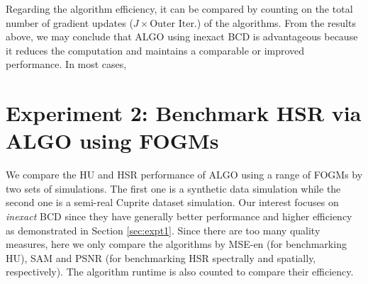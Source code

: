 Regarding the algorithm efficiency, it can be compared by counting on the 
total number of gradient updates ($J\times\text{Outer Iter.}$) of the
algorithms.
From the results above, we may conclude that ALGO using inexact BCD is
advantageous because it reduces the computation and maintains a comparable or
improved performance.
In most cases, 

\section{Experiment 2: Benchmark HSR via ALGO using FOGMs}
We compare the HU and HSR performance of ALGO using a range of FOGMs by two
sets of simulations.
The first one is a synthetic data simulation while the second one is a
semi-real Cuprite dataset simulation.
Our interest focuses on \textit{inexact} BCD since they have generally better
performance and higher efficiency as demonstrated in Section \ref{sec:expt1}.
Since there are too many quality measures, here we only compare the algorithms
by MSE-en (for benchmarking HU), SAM and PSNR (for benchmarking HSR spectrally
and spatially, respectively).
The algorithm runtime is also counted to compare their efficiency.
